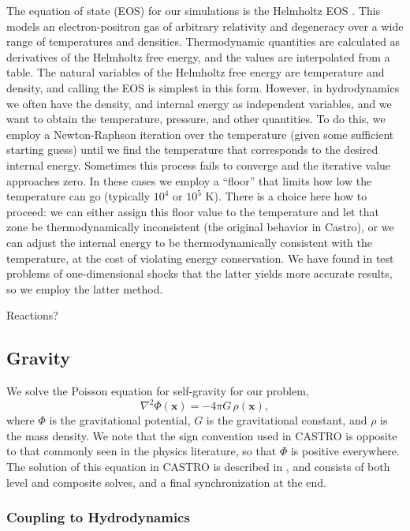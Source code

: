 \documentclass[12pt,preprint]{aastex}
\begin{document}
The equation of state (EOS) for our simulations is the Helmholtz EOS \citep{timmes_swesty:2000}. This models an electron-positron gas of arbitrary relativity and degeneracy over a wide range of temperatures and densities. Thermodynamic quantities are calculated as derivatives of the Helmholtz free energy, and the values are interpolated from a table. The natural variables of the Helmholtz free energy are temperature and density, and calling the EOS is simplest in this form. However, in hydrodynamics we often have the density, and internal energy as independent variables, and we want to obtain the temperature, pressure, and other quantities. To do this, we employ a Newton-Raphson iteration over the temperature (given some sufficient starting guess) until we find the temperature that corresponds to the desired internal energy. Sometimes this process fails to converge and the iterative value approaches zero. In these cases we employ a ``floor'' that limits how low the temperature can go (typically $10^4$ or $10^5$ K). There is a choice here how to proceed: we can either assign this floor value to the temperature and let that zone be thermodynamically inconsistent (the original behavior in Castro), or we can adjust the internal energy to be thermodynamically consistent with the temperature, at the cost of violating energy conservation. We have found in test problems of one-dimensional shocks that the latter yields more accurate results, so we employ the latter method.

Reactions?

\subsection{Gravity}
\label{sec:gravity}

We solve the Poisson equation for self-gravity for our problem,
\begin{equation}
  \nabla^2 \Phi(\mathbf{x}) = -4\pi G\, \rho(\mathbf{x}),
\end{equation}
where $\Phi$ is the gravitational potential, $G$ is the gravitational constant, and $\rho$ is the mass density. We note that the sign convention used in CASTRO is opposite to that commonly seen in the physics literature, so that $\Phi$ is positive everywhere. The solution of this equation in CASTRO is described in \cite{castro}, and consists of both level and composite solves, and a final synchronization at the end.

\subsubsection{Coupling to Hydrodynamics}\label{sec:gravity_hydro_coupling}
\end{document}
